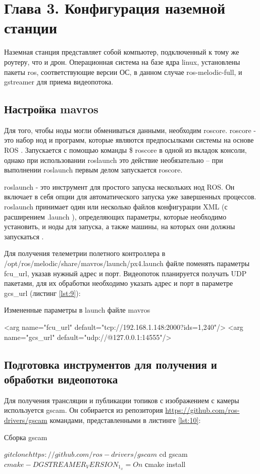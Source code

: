 
\section{Глава 3. Конфигурация наземной станции}
Наземная станция представляет собой компьютер, подключенный к тому же роутеру, что и дрон. Операционная система на базе ядра linux, установлены пакеты ros, соответствующие версии ОС, в данном случае ros-melodic-full, и gstreamer для приема видеопотока.

\subsection{Настройка mavros}
Для того, чтобы ноды могли обмениваться данными, необходим roscore. roscore - это набор нод и программ, которые являются предпосылками системы на основе ROS \cite{ros}. Запускается с помощью команды \$ roscore в одной из вкладок консоли, однако при использовании roslaunch это действие необязательно -- при выполнении roslaunch первым делом запускается roscore.

roslaunch - это инструмент для простого запуска нескольких нод ROS. Он включает в себя опции для автоматического запуска уже завершенных процессов. roslaunch принимает один или несколько файлов конфигурации XML (с расширением .launch ), определяющих параметры, которые необходимо установить, и ноды для запуска, а также машины, на которых они должны запускаться \cite{ros}.

Для получения телеметрии полетного контроллера в /opt/ros/melodic/sha\-re/mavros/launch/px4.launch файле поменять параметры fcu\_url, указав нужный адрес и порт. Видеопоток планируется получать UDP пакетами, для их обработки необходимо указать адрес и порт в параметре gcs\_url (листинг \ref{lst:9}):
\begin{Program}[H]
	\caption{Измененные параметры в launch файле mavros} \label{lst:9}
\begin{MyCode}
<arg name="fcu_url" default="tcp://192.168.1.148:2000?ids=1,240"/>   
<arg name="gcs_url" default="udp://@127.0.0.1:14555"/>
\end{MyCode}
\end{Program}

\subsection{Подготовка инструментов для получения и обработки видеопотока}
Для получения трансляции и публикации топиков с изображением с камеры используется gscam. Он собирается из репозитория \url{https://github.com/ros-drivers/gscam} командами, представленными в листинге \ref{lst:10}:
\begin{Program}[H]
	\caption{Сборка gscam} \label{lst:10}
\begin{MyCode}
$ git clone https://github.com/ros-drivers/gscam
$ cd gscam
$ cmake -DGSTREAMER_VERSION_1_x=On
$ сmake install
\end{MyCode}
\end{Program}

